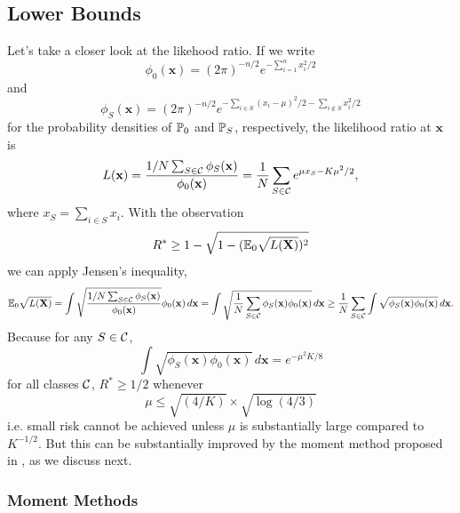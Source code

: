 \documentclass[10pt, oneside]{article}
\begin{document}
\subsection{Lower Bounds}
Let's take a closer look at the likehood ratio. If we write 
%
\[
\phi_0(\mathbf{x}) = (2\pi)^{-n/2} e^{-\sum_{i=1}^n x_i^2/2}
\]
%
and
%
\[
\phi_S(\mathbf{x}) = (2\pi)^{-n/2} e^{-\sum_{i\in S}(x_i-\mu
)^2/2-\sum
_{i\notin S} x_i^2/2}
\]
for the
probability densities of $\mathbb{P}_0$ and $\mathbb{P}_S$, respectively,
the likelihood ratio at $\mathbf{x}$ is
\[
L(\mathbf{x})
= \frac{{1/N}\sum_{S\in{\mathcal C}} \phi_S(\mathbf{x})}{\phi
_0(\mathbf{x})}
= \frac{1}{N} \sum_{S\in{\mathcal C}}
e^{\mu x_S - K\mu^2/2},
\]
where $x_S = \sum_{i\in S} x_i$. With the observation \cite{devroye2013probabilistic}
$$R^* \ge 1 - \sqrt{1 - (\mathbb{E}_0 \sqrt{L(\mathbf{X})})^2}$$
we can apply Jensen's inequality, 
\[
\mathbb{E}_0 \sqrt{L(\mathbf{X})} = \int\sqrt{\frac{{1/N}\sum_{S\in{\mathcal C}} \phi_S(\mathbf{x})}{\phi
_0(\mathbf{x})}} \phi
_0(\mathbf{x}) \,d\mathbf{x}
= \int\sqrt{\frac{1}{N} \sum_{S\in{\mathcal C}} \phi_S(\mathbf{x}) \phi
_0(\mathbf{x})} \,d\mathbf{x}
\ge\frac{1}{N} \sum_{S\in{\mathcal C}}
\int\sqrt{ \phi_S(\mathbf{x}) \phi_0(\mathbf{x})} \,d\mathbf{x}.
\] 
Because for any $S\in{\mathcal C}$,
\[
\int\sqrt{ \phi_S(\mathbf{x}) \phi_0(\mathbf{x})} \,d\mathbf
{x}=e^{-\mu^2K/8}
\]
for all classes ${\mathcal C}$, $R^* \ge1/2$ whenever
\begin{equation}
  \label{eq: loose lower bound}
  \mu\le\sqrt{(4/K)}\times\sqrt{\log(4/3)}
\end{equation}
i.e. small risk cannot be achieved unless $\mu$ is substantially large compared to $K^{-1/2}$. But this can be substantially improved by the moment method proposed in \cite{addario2010combinatorial}, as we discuss next.

%
\subsubsection{Moment Methods}
\label{subsubsec:Moment Methods}
%
\end{document}
